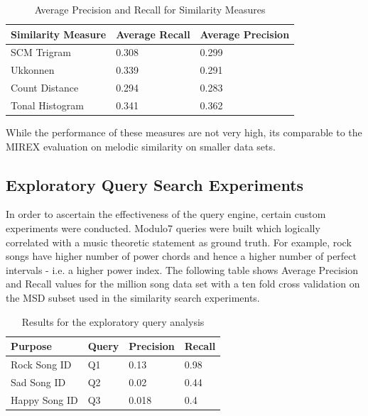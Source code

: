 \documentclass{article}
\begin{document}
\begin{table}[h]
\begin{center}
    \begin{tabular}{| l | l | l |}
    \hline
    Similarity Measure & Average Recall & Average Precision \\ \hline
    SCM Trigram & 0.308 & 0.299 \\ \hline
    Ukkonnen & 0.339 & 0.291 \\ \hline
    Count Distance & 0.294 & 0.283  \\ \hline
    Tonal Histogram & 0.341 & 0.362  \\ \hline
    \end{tabular}
\end{center}

While the performance of these measures are not very high, its comparable to the MIREX evaluation \cite{mirex} on melodic similarity on smaller data sets. 

\caption{Average Precision and Recall for Similarity Measures}
\end{table}

\subsection{Exploratory Query Search Experiments}

In order to ascertain the effectiveness of the query engine, certain custom experiments were conducted. Modulo7 queries were built which logically correlated with a music theoretic statement as ground truth. For example, rock songs have higher number of power chords and hence a higher number of perfect intervals - i.e. a higher power index. The following table shows Average Precision and Recall values for the million song data set \cite{msd} with a ten fold cross validation on the MSD subset \cite{msd} used in the similarity search experiments. 

\begin{table}[!htb]
\begin{center}
    \begin{tabular}{| l | l | l | l |}
    \hline
    Purpose &  Query & Precision  & Recall \\ \hline
    Rock Song ID &  Q1 & 0.13  & 0.98 \\ \hline
    Sad Song ID &  Q2 & 0.02  & 0.44 \\ \hline
    Happy Song ID &  Q3 & 0.018  & 0.4 \\
    \hline
    \end{tabular}
\end{center}
\caption{Results for the exploratory query analysis}
\end{table}
\end{document}
